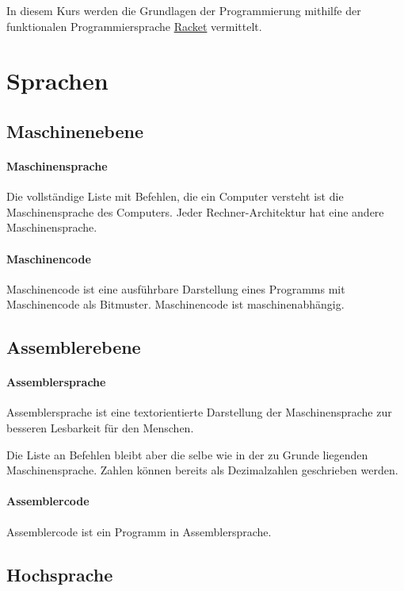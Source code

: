 \documentclass[../main.tex]{subfiles}
\begin{document}
    In diesem Kurs werden die Grundlagen der Programmierung mithilfe der funktionalen Programmiersprache \href{https://racket-lang.org}{Racket} vermittelt.
    \clearpage
    
    \section{Sprachen}
        \subsection{Maschinenebene}
            \paragraph{Maschinensprache}
                Die vollständige Liste mit Befehlen, die ein Computer versteht ist die Maschinensprache des Computers. Jeder Rechner-Architektur hat eine andere Maschinensprache.
                
            \paragraph{Maschinencode}
                Maschinencode ist eine ausführbare Darstellung eines Programms mit Maschinencode als Bitmuster. Maschinencode ist maschinenabhängig.
            
        \subsection{Assemblerebene}
            \paragraph{Assemblersprache}
                Assemblersprache ist eine textorientierte Darstellung der Maschinensprache zur besseren Lesbarkeit für den Menschen.
                
                Die Liste an Befehlen bleibt aber die selbe wie in der zu Grunde liegenden Maschinensprache. Zahlen können bereits als Dezimalzahlen geschrieben werden.
                
            \paragraph{Assemblercode}
                Assemblercode ist ein Programm in Assemblersprache.
        
        \subsection{Hochsprache}
\end{document}
